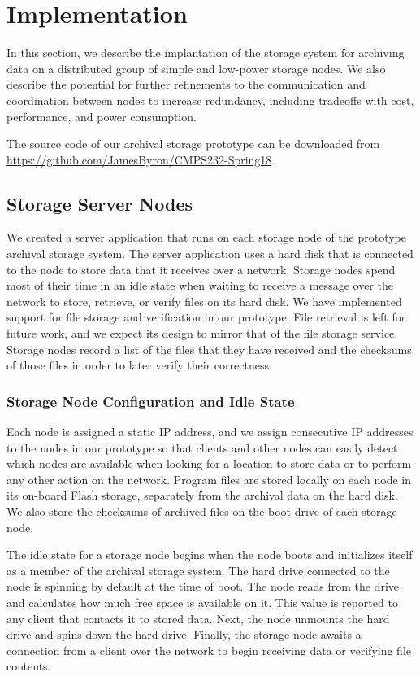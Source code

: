 \section{Implementation}
In this section, we describe the implantation of the storage system for archiving data on a distributed group of simple and low-power storage nodes.  We also describe the potential for further refinements to the communication and coordination between nodes to increase redundancy, including tradeoffs with cost, performance, and power consumption.

The source code of our archival storage prototype can be downloaded from \url{https://github.com/JamesByron/CMPS232-Spring18}.

\subsection{Storage Server Nodes}
We created a server application that runs on each storage node of the prototype archival storage system.  The server application uses a hard disk that is connected to the node to store data that it receives over a network.  Storage nodes spend most of their time in an idle state when waiting to receive a message over the network to store, retrieve, or verify files on its hard disk.  We have implemented support for file storage and verification in our prototype.  File retrieval is left for future work, and we expect its design to mirror that of the file storage service.  Storage nodes record a list of the files that they have received and the checksums of those files in order to later verify their correctness.

\subsubsection{Storage Node Configuration and Idle State}
Each node is assigned a static IP address, and we assign consecutive IP addresses to the nodes in our prototype so that clients and other nodes can easily detect which nodes are available when looking for a location to store data or to perform any other action on the network.  Program files are stored locally on each node in its on-board Flash storage, separately from the archival data on the hard disk.  We also store the checksums of archived files on the boot drive of each storage node.

The idle state for a storage node begins when the node boots and initializes itself as a member of the archival storage system.  The hard drive connected to the node is spinning by default at the time of boot.  The node reads from the drive and calculates how much free space is available on it.  This value is reported to any client that contacts it to stored data.  Next, the node unmounts the hard drive and spins down the hard drive.  Finally, the storage node awaits a connection from a client over the network to begin receiving data or verifying file contents.

